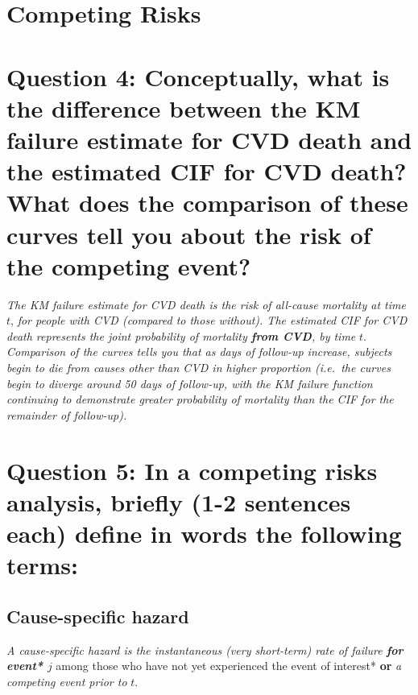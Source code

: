 \documentclass[]{article}
\begin{document}
\vspace{12pt}

\section{Competing Risks}\label{competing-risks}

\section{Question 4: Conceptually, what is the difference between the KM
failure estimate for CVD death and the estimated CIF for CVD death? What
does the comparison of these curves tell you about the risk of the
competing
event?}\label{question-4-conceptually-what-is-the-difference-between-the-km-failure-estimate-for-cvd-death-and-the-estimated-cif-for-cvd-death-what-does-the-comparison-of-these-curves-tell-you-about-the-risk-of-the-competing-event}

\emph{The KM failure estimate for CVD death is the risk of all-cause
mortality at time} \(t\), \emph{for people with CVD (compared to those
without). The estimated CIF for CVD death represents the joint
probability of mortality \textbf{from CVD}, by time} \(t\).
\emph{Comparison of the curves tells you that as days of follow-up
increase, subjects begin to die from causes other than CVD in higher
proportion (i.e.~the curves begin to diverge around 50 days of
follow-up, with the KM failure function continuing to demonstrate
greater probability of mortality than the CIF for the remainder of
follow-up).}

\vspace{12pt}

\section{Question 5: In a competing risks analysis, briefly (1-2
sentences each) define in words the following
terms:}\label{question-5-in-a-competing-risks-analysis-briefly-1-2-sentences-each-define-in-words-the-following-terms}

\subsection{Cause-specific hazard}\label{cause-specific-hazard}

\emph{A cause-specific hazard is the instantaneous (very short-term)
rate of failure \textbf{for event* \(j\)} }among those who have not yet
experienced the event of interest* \textbf{or} \emph{a competing event
prior to} \(t\).
\end{document}

